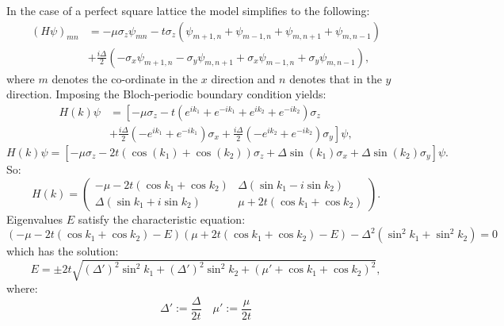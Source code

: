 \documentclass[a4paper]{article}
\begin{document}
In the case of a perfect square lattice the model simplifies to the following: 
\begin{equation}
\begin{split}
	(H \psi)_{mn} &= - \mu \sigma_z \psi_{mn} - t \sigma_z \left( \psi_{m+1,n} + \psi_{m-1,n} + \psi_{m,n+1} + \psi_{m,n-1} \right) \\
	&+ \frac{ i \Delta }{ 2 } \left( - \sigma_x \psi_{m+1,n} - \sigma_y \psi_{m,n+1} + \sigma_x \psi_{m-1,n} + \sigma_y \psi_{m,n-1} \right),
\end{split}
\end{equation}
where $m$ denotes the co-ordinate in the $x$ direction and $n$ denotes that in the $y$ direction. Imposing the Bloch-periodic boundary condition yields:
\begin{equation}
\begin{split}
	H(k) \psi &= \left[ - \mu \sigma_z - t \left( e^{i k_1} + e^{- i k_1} + e^{i k_2} + e^{- i k_2} \right) \sigma_z \right. \\
	&\left. + \frac{ i \Delta }{ 2 } \left( -  e^{i k_1} + e^{- i k_1} \right) \sigma_x + \frac{ i \Delta }{ 2 } \left( - e^{i k_2} + e^{- i k_2} \right) \sigma_y \right] \psi,
\end{split}
\end{equation}
\begin{equation}
	H(k) \psi = \left[ - \mu \sigma_z - 2 t \left( \cos(k_1) + \cos(k_2) \right) \sigma_z + \Delta \sin(k_1) \sigma_x + \Delta \sin(k_2) \sigma_y \right] \psi. 
\end{equation}
So:
\begin{equation}
	H(k) = \begin{pmatrix} - \mu - 2 t ( \cos k_1 + \cos k_2 ) & \Delta ( \sin k_1 - i \sin k_2 ) \\ \Delta ( \sin k_1 + i \sin k_2 ) & \mu + 2 t ( \cos k_1 + \cos k_2 ) \end{pmatrix}.
\end{equation}
Eigenvalues $E$ satisfy the characteristic equation:
\begin{equation}
	( - \mu - 2 t ( \cos k_1 + \cos k_2 ) - E )( \mu + 2 t ( \cos k_1 + \cos k_2 ) - E ) - \Delta^2 ( \sin^2 k_1 + \sin^2 k_2 ) = 0
\end{equation}
which has the solution:
\begin{equation} \label{eq:eval_funcs}
	E = \pm 2 t \sqrt{ (\Delta')^2 \sin^2 k_1 + (\Delta')^2 \sin^2 k_2 + \left( \mu' + \cos k_1 + \cos k_2 \right)^2 },
\end{equation}
where:
\begin{equation}
	\Delta' := \frac{\Delta}{2 t} \quad \mu' := \frac{ \mu }{ 2 t }
\end{equation}
\end{document}
